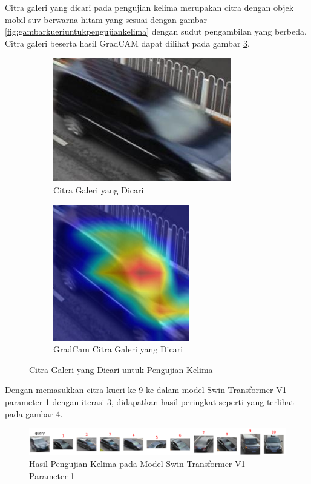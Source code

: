 Citra galeri yang dicari pada pengujian kelima merupakan citra dengan objek \linebreak mobil suv berwarna hitam 
yang sesuai dengan gambar \ref{fig:gambarkueriuntukpengujiankelima} dengan sudut pengambilan yang berbeda. 
Citra galeri beserta hasil GradCAM dapat dilihat pada gambar \ref{fig:gambargaleriuntukpengujiankelima}.

\begin{figure}[h!]
  \centering
  \begin{subfigure}{.5\textwidth}
    \centering
    \includegraphics[width=.4\linewidth]{gambar/Gal9_1019.jpg}
    \caption{Citra Galeri yang Dicari}
    \label{gambargalerinomorsembilan}
  \end{subfigure}%
  \begin{subfigure}{.5\textwidth}
    \centering
    \includegraphics[width=.4\linewidth]{gambar/GradCamGal9_1019.jpg}
    \caption{GradCam Citra Galeri yang Dicari}
    \label{gradcamgambargalerinomorsembilan}
  \end{subfigure}
  \caption{Citra Galeri yang Dicari untuk Pengujian Kelima}
  \label{fig:gambargaleriuntukpengujiankelima}
\end{figure}

Dengan memasukkan citra kueri ke-9 ke dalam model Swin Transformer V1 parameter 1 dengan iterasi 3, didapatkan hasil 
peringkat seperti yang terlihat pada gambar \ref{fig:hasilpengujiankelimapadamodelswintransformerv1param1}.

\begin{figure}[h!]
  \centering
  \includegraphics[scale=0.6]{gambar/Que9V1P1IT3.png}
  \caption{Hasil Pengujian Kelima pada Model Swin Transformer V1 Parameter 1}
  \label{fig:hasilpengujiankelimapadamodelswintransformerv1param1}
\end{figure}

